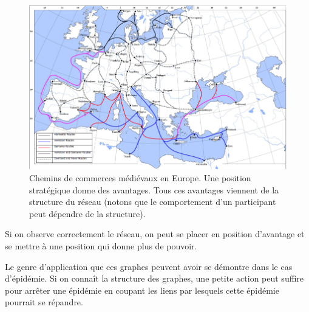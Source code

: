 \begin{figure}[!ht]
\centering
\includegraphics[width=0.9\linewidth]{images/map_of_medieval_trade_routes.png}
\caption{Chemins de commerces médiévaux en Europe. Une position
    stratégique donne des avantages. Tous ces avantages viennent de la
    structure du réseau (notons que le comportement d'un participant
peut dépendre de la structure).}
\end{figure}

Si on observe correctement le réseau, on peut se placer en position
d'avantage et se mettre à une position qui donne plus de pouvoir.

Le genre d'application que ces graphes peuvent avoir se démontre dans le
cas d'épidémie. Si on connaît la structure des graphes, une petite
action peut suffire pour arrêter une épidémie en coupant les liens par
lesquels cette épidémie pourrait se répandre.
